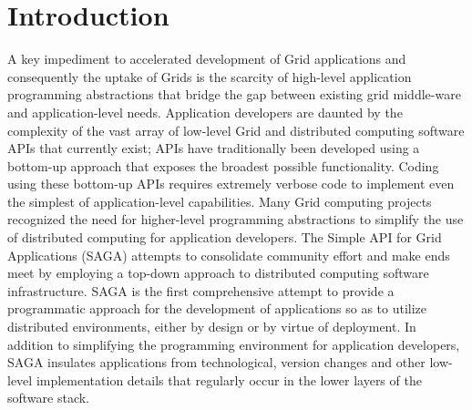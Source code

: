 \documentclass[conference,final]{IEEEtran}
\begin{document}
\section{Introduction}

A key impediment to accelerated development of Grid applications and
consequently the uptake of Grids is the scarcity of high-level
application programming abstractions that bridge the gap between
existing grid middle-ware and application-level needs.  Application
developers are daunted by the complexity of the vast array of
low-level Grid and distributed computing software APIs that currently
exist; APIs have traditionally been developed using a bottom-up
approach that exposes the broadest possible functionality.  Coding
using these bottom-up APIs requires extremely verbose code to
implement even the simplest of application-level capabilities.  Many
Grid computing projects~\cite{gat, cog, realitygrid} recognized the
need for higher-level programming abstractions to simplify the use of
distributed computing for application developers.  The Simple API for
Grid Applications (SAGA) attempts to consolidate community effort and
make ends meet by employing a top-down approach to distributed
computing software infrastructure.  SAGA is the first comprehensive
attempt to provide a programmatic approach for the development of
applications so as to utilize distributed environments, either by
design or by virtue of deployment.  In addition to simplifying the
programming environment for application developers, SAGA insulates
applications from technological, version changes and other low-level
implementation details that regularly occur in the lower layers of the
software stack.
\end{document}
